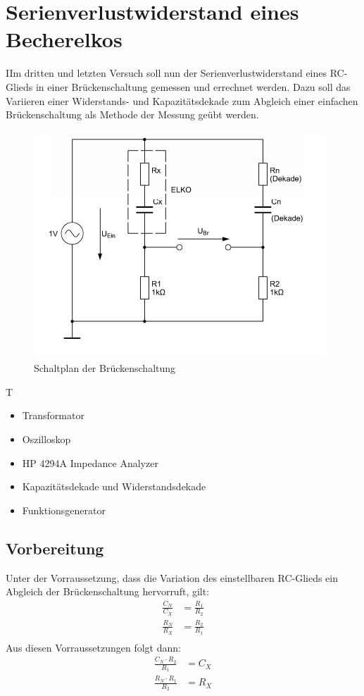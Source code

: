 \documentclass{article}
\begin{document}
\section{Serienverlustwiderstand eines Becherelkos}
\begin{task}
  IIm dritten und letzten Versuch soll nun der Serienverlustwiderstand eines RC-Glieds in einer Brückenschaltung gemessen und errechnet werden.
  Dazu soll das Variieren einer Widerstands- und Kapazitätsdekade zum Abgleich einer einfachen Brückenschaltung als Methode der Messung geübt werden.
\end{task}
\begin{figure}[h]
  \begin{center}
    \includegraphics[scale=0.8]{assets/images/Versuch3Schaltplan.PNG}
    \caption{Schaltplan der Brückenschaltung}
  \end{center}
\end{figure}
\begin{devlist}
  T
  \begin{itemize}
    \item Transformator
    \item Oszilloskop
    \item HP 4294A Impedance Analyzer
    \item Kapazitätsdekade und Widerstandsdekade
    \item Funktionsgenerator
  \end{itemize}
\end{devlist}
\subsection{Vorbereitung}
Unter der Vorraussetzung, dass die Variation des einstellbaren RC-Glieds ein Abgleich der Brückenschaltung hervorruft, gilt:
\begin{align*}
  \frac{C_N}{C_X} & = \frac{R_1}{R_2} \\
  \frac{R_N}{R_X} & = \frac{R_2}{R_1} \\
\end{align*}
Aus diesen Vorraussetzungen folgt dann:
\begin{align}
  \frac{C_N\cdot R_2}{R_1} & = C_X\label{eq:CX} \\
  \frac{R_N\cdot R_1}{R_2} & = R_X\label{eq:RX}
\end{align}
\end{document}
